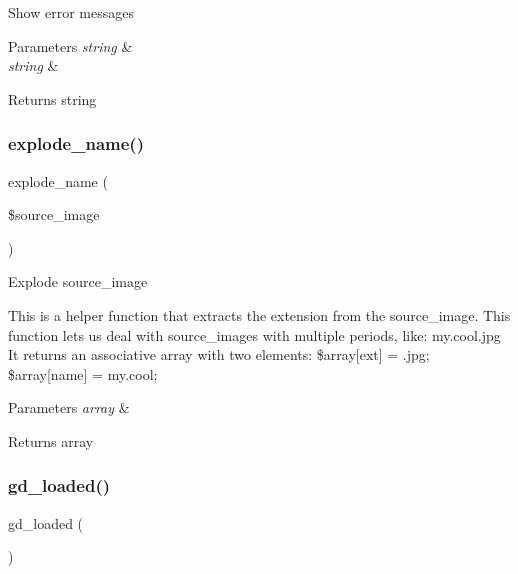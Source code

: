 Show error messages


\begin{DoxyParams}{Parameters}
{\em string} & \\
\hline
{\em string} & \\
\hline
\end{DoxyParams}
\begin{DoxyReturn}{Returns}
string 
\end{DoxyReturn}
\mbox{\label{class_c_i___image__lib_a32661288e0bea18ea50fbb7be6535af5}} 
\subsubsection{\texorpdfstring{explode\+\_\+name()}{explode\_name()}}
{\footnotesize\ttfamily explode\+\_\+name (\begin{DoxyParamCaption}\item[{}]{\$source\+\_\+image }\end{DoxyParamCaption})}

Explode source\+\_\+image

This is a helper function that extracts the extension from the source\+\_\+image. This function lets us deal with source\+\_\+images with multiple periods, like\+: my.\+cool.\+jpg It returns an associative array with two elements\+: \$array\mbox{[}\textquotesingle{}ext\textquotesingle{}\mbox{]} = \textquotesingle{}.jpg\textquotesingle{}; \$array\mbox{[}\textquotesingle{}name\textquotesingle{}\mbox{]} = \textquotesingle{}my.\+cool\textquotesingle{};


\begin{DoxyParams}{Parameters}
{\em array} & \\
\hline
\end{DoxyParams}
\begin{DoxyReturn}{Returns}
array 
\end{DoxyReturn}
\mbox{\label{class_c_i___image__lib_a04376d5530f38a1a61f59c2d769284ba}} 
\subsubsection{\texorpdfstring{gd\+\_\+loaded()}{gd\_loaded()}}
{\footnotesize\ttfamily gd\+\_\+loaded (\begin{DoxyParamCaption}{ }\end{DoxyParamCaption})}

